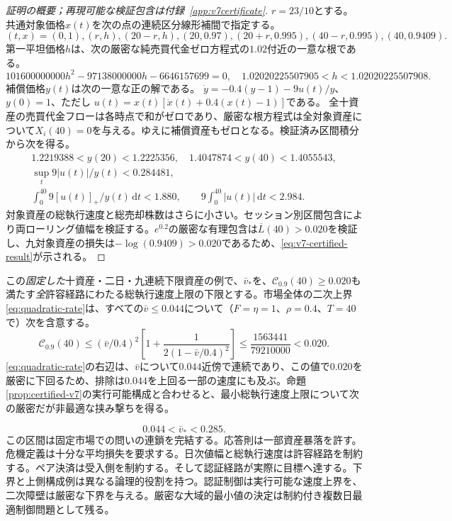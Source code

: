 \documentclass[11pt]{article}
\numberwithin{equation}{section}
\theoremstyle{definition}
\theoremstyle{remark}
\newcommand{\Cris}{\mathcal{C}}
\newcommand{\dd}{\,\mathrm{d}}
\begin{document}
\begin{proof}[証明の概要；再現可能な検証包含は付録~\ref{app:v7certificate}]
$r=23/10$とする。共通対象価格$x(t)$を次の点の連続区分線形補間で指定する。
\begin{equation}\label{eq:v7-knots}
(t,x)=(0,1),(r,h),(20-r,h),(20,0.97),(20+r,0.995),(40-r,0.995),(40,0.9409).
\end{equation}
第一平坦価格$h$は、次の厳密な純売買代金ゼロ方程式の$1.02$付近の一意な根である。
\begin{equation}\label{eq:v7-root}
101600000000h^2-97138000000h-6646157699=0,
\quad1.02020225507905<h<1.02020225507908.
\end{equation}
補償価格$y(t)$は次の一意な正の解である。
$\dot y=-0.4(y-1)-9u(t)/y$、$y(0)=1$、ただし
$u(t)=x(t)[\dot x(t)+0.4(x(t)-1)]$である。
全十資産の売買代金フローは各時点で和がゼロであり、厳密な根方程式は全対象資産について$X_i(40)=0$を与える。ゆえに補償資産もゼロとなる。検証済み区間積分から次を得る。
\begin{equation}\label{eq:v7-bounds}
\begin{gathered}
1.2219388<y(20)<1.2225356,\quad
1.4047874<y(40)<1.4055543,\\
\sup_t9|u(t)|/y(t)<0.284481,\\
\int_0^{40}9[u(t)]_+/y(t)\dd t<1.880,\qquad
9\int_0^{40}|u(t)|\dd t<2.984.
\end{gathered}
\end{equation}
対象資産の総執行速度と総売却株数はさらに小さい。セッション別区間包含により両ローリング値幅を検証する。$e^{0.2}$の厳密な有理包含は$\overline L(40)>0.020$を検証し、九対象資産の損失は$-\log(0.9409)>0.020$であるため、\eqref{eq:v7-certified-result}が示される。
\end{proof}
この\emph{固定した}十資産・二日・九連続下限資産の例で、$\bar v_*$を、$\Cris_{0.9}(40)\ge0.020$も満たす\emph{全}許容経路にわたる総執行速度上限の下限とする。市場全体の二次上界\eqref{eq:quadratic-rate}は、すべての$\bar v\le 0.044$について（$F=\eta=1$、$\rho=0.4$、$T=40$で）次を含意する。
\[
\Cris_{0.9}(40)\le (\bar v/0.4)^2
\left[1+\frac{1}{2(1-\bar v/0.4)^2}\right]
\le \frac{1563441}{79210000}<0.020.
\]
\eqref{eq:quadratic-rate}の右辺は、$\bar v$について$0.044$近傍で連続であり、この値で$0.020$を厳密に下回るため、排除は$0.044$を上回る一部の速度にも及ぶ。命題\ref{prop:certified-v7}の実行可能構成と合わせると、最小総執行速度上限について次の厳密だが非最適な挟み撃ちを得る。

\begin{equation}\label{eq:v7-rate-bracket}
\boxed{\qquad 0.044<\bar v_*<0.285.\qquad}
\end{equation}
この区間は固定市場での問いの連鎖を完結する。応答則は一部資産暴落を許す。危機定義は十分な平均損失を要求する。日次値幅と総執行速度は許容経路を制約する。ペア決済は受入側を制約する。そして認証経路が実際に目標へ達する。下界と上側構成例は異なる論理的役割を持つ。認証制御は実行可能な速度上界を、二次障壁は厳密な下界を与える。厳密な大域的最小値の決定は制約付き複数日最適制御問題として残る。
\end{document}
